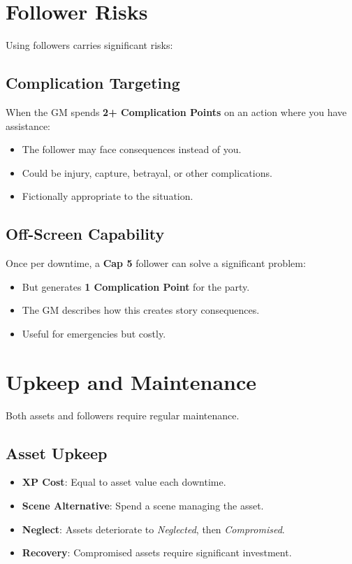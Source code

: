 \begin{multicols}{2}
\section{Follower Risks}

Using followers carries significant risks:

\subsection*{Complication Targeting}
When the GM spends \textbf{2+ Complication Points} on an action where you have assistance:
\begin{itemize}
\item The follower may face consequences instead of you.
\item Could be injury, capture, betrayal, or other complications.
\item Fictionally appropriate to the situation.
\end{itemize}

\subsection*{Off-Screen Capability}
Once per downtime, a \textbf{Cap 5} follower can solve a significant problem:
\begin{itemize}
\item But generates \textbf{1 Complication Point} for the party.
\item The GM describes how this creates story consequences.
\item Useful for emergencies but costly.
\end{itemize}

\section{Upkeep and Maintenance}

Both assets and followers require regular maintenance.

\subsection*{Asset Upkeep}
\begin{itemize}
\item \textbf{XP Cost}: Equal to asset value each downtime.
\item \textbf{Scene Alternative}: Spend a scene managing the asset.
\item \textbf{Neglect}: Assets deteriorate to \emph{Neglected}, then \emph{Compromised}.
\item \textbf{Recovery}: Compromised assets require significant investment.
\end{itemize}


\end{multicols}
